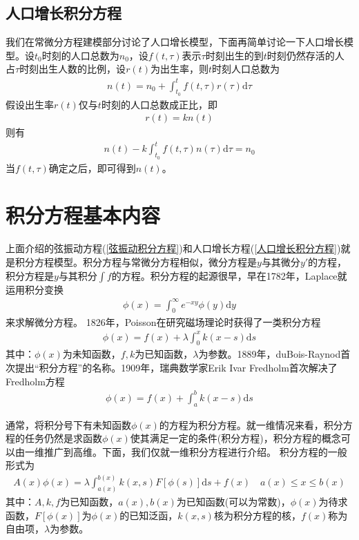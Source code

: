 	\subsection{人口增长积分方程}
		\label{subsec:人口增长积分方程}
		我们在常微分方程建模部分讨论了人口增长模型，下面再简单讨论一下人口增长模型。设$t_0$时刻的人口总数为$n_0$，设$f(t,\tau)$表示$\tau$时刻出生的到$t$时刻仍然存活的人占$\tau$时刻出生人数的比例，设$r(t)$为出生率，则$t$时刻人口总数为
		\begin{align*}
			n(t) = n_0 + \int_{t_0}^tf(t,\tau) r(\tau)\mathrm{d} \tau
		\end{align*}
		假设出生率$r(t)$仅与$t$时刻的人口总数成正比，即
		\begin{align*}
			r(t) = k n(t)
		\end{align*}
		则有
		\begin{align}
			\label{人口增长积分方程}
			n(t) - k\int_{t_0}^tf(t,\tau) n(\tau)\mathrm{d} \tau = n_0
		\end{align}
		当$f(t,\tau)$确定之后，即可得到$n(t)$。

\section{积分方程基本内容}
	\label{sec:积分方程基本内容}
	上面介绍的弦振动方程(\ref{弦振动积分方程})和人口增长方程(\ref{人口增长积分方程})就是积分方程模型。积分方程与常微分方程相似，微分方程是$y$与其微分$y'$的方程，积分方程是$y$与其积分$\int f$的方程。积分方程的起源很早，早在1782年，Laplace就运用积分变换
	\begin{align*}
		\phi (x) = \int_0^\infty e^{-xy} \phi(y) \mathrm{d}y
	\end{align*}
	来求解微分方程。
	1826年，Poisson在研究磁场理论时获得了一类积分方程
	\begin{align*}
		\phi (x) = f(x) + \lambda \int_0^x k(x- s) \mathrm{d}s
	\end{align*}
	其中：$\phi(x)$为未知函数，$f,k$为已知函数，$\lambda$为参数。1889年，duBois-Raynod首次提出“积分方程”的名称。1909年，瑞典数学家Erik Ivar Fredholm首次解决了Fredholm方程
	\begin{align*}
		\phi (x) = f(x) + \int_a^b k(x- s) \mathrm{d}s
	\end{align*}
	\par
	通常，将积分号下有未知函数$\phi(x)$的方程为积分方程。就一维情况来看，积分方程的任务仍然是求函数$\phi(x)$使其满足一定的条件(积分方程)，积分方程的概念可以由一维推广到高维。下面，我们仅就一维积分方程进行介绍。
	积分方程的一般形式为
	\begin{align*}
		A(x)\phi(x) = \lambda \int_{a(x)}^{b(x)} k(x,s) F[\phi(s)]\mathrm{d}s + f(x) \quad a(x) \leqslant x \leqslant b(x)
	\end{align*}
	其中：$A,k,f$为已知函数，$a(x),b(x)$为已知函数(可以为常数)，$\phi(x)$为待求函数，$F[\phi(x)]$为$\phi(x)$的已知泛函，$k(x,s)$核为积分方程的核，$f(x)$称为自由项，$\lambda$为参数。
